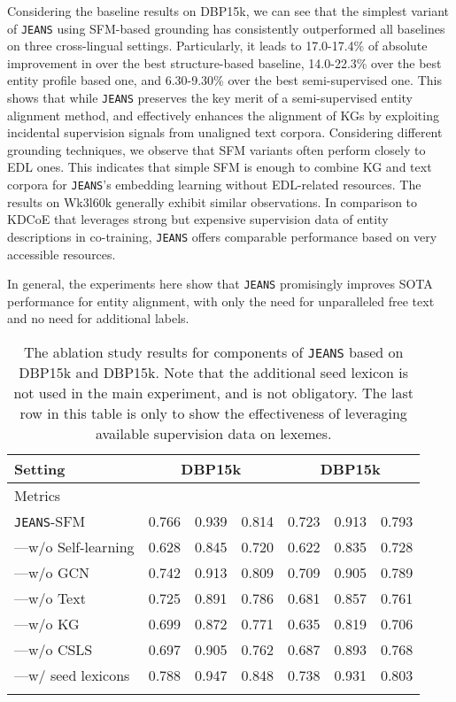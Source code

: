 \documentclass[11pt,a4paper]{article}
\newcommand{\modelname}[0]{\texttt{JEANS}\xspace}
\def\bhline{\specialrule{.2em}{0em}{0em}}
\begin{document}
Considering the baseline results on DBP15k, we can see that the simplest variant of \modelname using SFM-based grounding has consistently outperformed all baselines on three cross-lingual settings.
Particularly, it leads to 17.0-17.4\% of absolute improvement in  over the best structure-based baseline, 14.0-22.3\% over the best entity profile based one, and 6.30-9.30\% over the best semi-supervised one.
This shows that while \modelname preserves the key merit of a semi-supervised entity alignment method,
and effectively enhances the alignment of KGs by exploiting incidental supervision signals from unaligned text corpora.
Considering different grounding techniques, we observe that SFM variants often perform closely to EDL ones.
This indicates that simple SFM is enough to combine KG and text corpora for \modelname's embedding learning without EDL-related resources.
The results on Wk3l60k generally exhibit similar observations. 
In comparison to KDCoE that leverages strong but expensive supervision data of entity descriptions in co-training, \modelname  offers comparable performance based on very accessible resources.

In general, the experiments here show that \modelname promisingly improves SOTA performance for entity alignment, with only the need for unparalleled free text and no need for additional labels.


{
\begin{table}[t]
\setlength\tabcolsep{1pt}
\centering
\footnotesize
\begin{tabular}{l|ccc|ccc}
\bhline
Setting&\multicolumn{3}{c|}{DBP15k}&\multicolumn{3}{c}{DBP15k}\\
\hline
Metrics&&&&&&\\
\bhline
\modelname-SFM&0.766&0.939&0.814&0.723&0.913&0.793\\
\hline
---w/o Self-learning&0.628&0.845&0.720&0.622&0.835&0.728\\
---w/o GCN&0.742&0.913&0.809&0.709&0.905&0.789\\
---w/o Text&0.725&0.891&0.786&0.681&0.857&0.761\\
---w/o KG&0.699&0.872&0.771&0.635&0.819&0.706\\
---w/o CSLS&0.697&0.905&0.762&0.687&0.893&0.768\\
---w/ seed lexicons&0.788&0.947&0.848&0.738&0.931&0.803\\
\bhline
\end{tabular}
\caption{The ablation study results for components of \modelname based on DBP15k and DBP15k. Note that the additional seed lexicon is not used in the main experiment, and is not obligatory. The last row in this table is only to show the effectiveness of leveraging available supervision data on lexemes.}\label{tbl:ablation}
\end{table}
}
\end{document}
